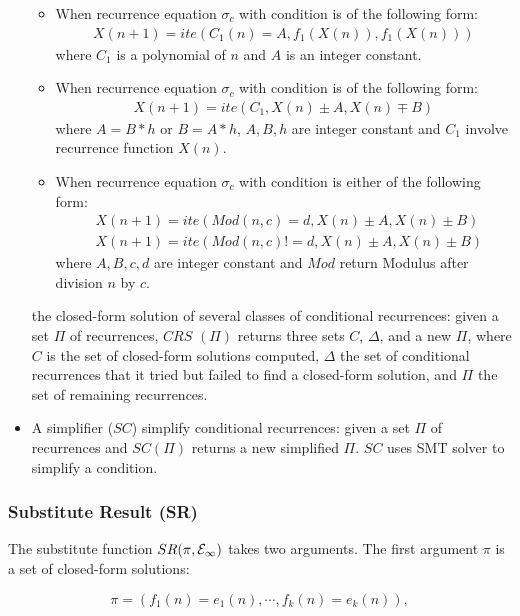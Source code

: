 \documentclass{article}
\begin{document}
\begin{itemize}
\begin{itemize}
	\item  When recurrence equation $\sigma_{c}$ with condition is of the following form:
	\begin{eqnarray}
		X(n+1)=ite(C_1(n)=A,f_1(X(n)),f_1(X(n))) \label{rec5}
	\end{eqnarray}
     where $C_1$ is a polynomial of $n$ and $A$ is an integer constant.
	\item  When recurrence equation $\sigma_{c}$ with condition is of the following form:
	\begin{eqnarray}
		X(n+1)=ite(C_1,X(n)\pm A,X(n)\mp B) \label{rec6}
	\end{eqnarray}
     where $A=B*h$ or $B=A*h$, $A,B,h$ are integer constant and $C_1$ involve recurrence function $X(n)$.
	\item When recurrence equation $\sigma_{c}$ with condition is either of the following form:
	\begin{eqnarray}
		&X(n+1)=ite(Mod(n,c)=d,X(n)\pm A,X(n)\pm B) \label{rec7}\\
		&X(n+1)=ite(Mod(n,c)!=d,X(n)\pm A,X(n)\pm B) \label{rec8}
	\end{eqnarray}
	where  $A,B,c,d$ are integer constant and $Mod$ return Modulus after division $n$ by $c$.
	
	\end{itemize}
the closed-form solution of several classes of  conditional recurrences:
given a set $\Pi$ of recurrences, $CRS$ $(\Pi)$
returns three sets $C$, $\Delta$, and a new $\Pi$,
where $C$ is the set of closed-form solutions computed, $\Delta$
the set of conditional
recurrences that it tried but failed to find a closed-form solution,
and $\Pi$ the set of remaining recurrences.
	\item A simplifier ($SC$) simplify conditional
recurrences: given a set $\Pi$ of recurrences and $SC(\Pi)$ returns a new simplified $\Pi$. $SC$ uses SMT solver to simplify a condition. 
\end{itemize}

\subsubsection{Substitute Result (SR)}
The substitute function $SR(\pi,{\cal E_1})$ takes two arguments. The first argument $\pi$ is a set of closed-form solutions:

\[
\pi = (f_1(n)=e_1(n), \cdots, f_k(n)=e_k(n)),
\]
\end{document}

